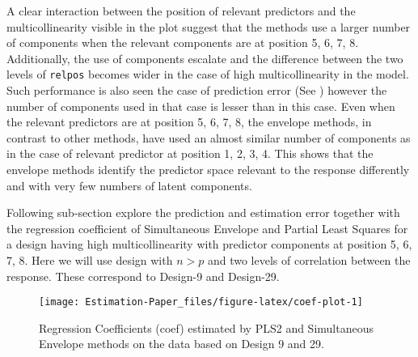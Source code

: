 \documentclass[12pt,3p,authoryear]{elsarticle}
\begin{document}
A clear interaction between the position of relevant predictors and the multicollinearity visible in the plot suggest that the methods use a larger number of components when the relevant components are at position 5, 6, 7, 8. Additionally, the use of components escalate and the difference between the two levels of \texttt{relpos} becomes wider in the case of high multicollinearity in the model. Such performance is also seen the case of prediction error (See \citet{rimal2019pred}) however the number of components used in that case is lesser than in this case. Even when the relevant predictors are at position 5, 6, 7, 8, the envelope methods, in contrast to other methods, have used an almost similar number of components as in the case of relevant predictor at position 1, 2, 3, 4. This shows that the envelope methods identify the predictor space relevant to the response differently and with very few numbers of latent components.

Following sub-section explore the prediction and estimation error together with the regression coefficient of Simultaneous Envelope and Partial Least Squares for a design having high multicollinearity with predictor components at position 5, 6, 7, 8. Here we will use design with \(n>p\) and two levels of correlation between the response. These correspond to Design-9 and Design-29.

\begin{figure}
\texttt{[image: Estimation-Paper\_files/figure-latex/coef-plot-1]} \caption{Regression Coefficients (coef) estimated by PLS2 and Simultaneous Envelope methods on the data based on Design 9 and 29.}\label{fig:coef-plot}
\end{figure}
\end{document}
